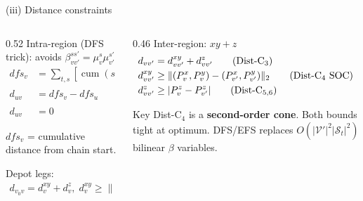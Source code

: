 \documentclass[aspectratio=169,10pt]{beamer}
\begin{document}
\begin{frame}{(iii) Distance constraints}
  \begin{columns}[T,onlytextwidth]
    \begin{column}{0.52\textwidth}
      {\small Intra-region (DFS trick): avoids $\beta_{vv'}^{ss'}=\mu_v^s\mu_{v'}^{s'}$}
      {\footnotesize
      \begin{align*}
        dfs_v &=\sum_{t,s}[\operatorname{cum}(s)\mu_v^{ts}+L(s)\eta_v^{ts}] \tag{DFS}\\
        d_{uv} &=dfs_v-dfs_u &&\!(u,v)\in\mathcal{E}_{RL}^{int} \tag{Dist-C$_1$}\\
        d_{uv} &=0 &&\!(u,v)\in\mathcal{E}_{LR}^{int} \tag{Dist-C$_2$}
      \end{align*}}
      {\scriptsize $dfs_v$ = cumulative distance from chain start. \par}
      \vspace{0.06cm}
      {\small Depot legs:}
      {\footnotesize
      \begin{align*}
        d_{v_0v}=d_v^{xy}+d_v^z,\; d_v^{xy}\ge\|(P_v^x,P_v^y)\|_2,\; d_v^z\ge|P_v^z| \tag{Dep-C}
      \end{align*}}
    \end{column}
    \begin{column}{0.46\textwidth}
      {\small Inter-region: $xy+z$}
      {\footnotesize
      \begin{align*}
        d_{vv'} &=d_{vv'}^{xy}+d_{vv'}^z \tag{Dist-C$_3$}\\
        d_{vv'}^{xy} &\ge\|(P_v^x,P_v^y)-(P_{v'}^x,P_{v'}^y)\|_2 \tag{Dist-C$_4$ SOC}\\
        d_{vv'}^z &\ge |P_v^z-P_{v'}^z| \tag{Dist-C$_{5,6}$}
      \end{align*}}
      \begin{block}{Key}
        {\scriptsize Dist-C$_4$ is a \textbf{second-order cone}. Both bounds tight at optimum. DFS/EFS replaces $O(|\mathcal{V}'|^2|\mathcal{S}_t|^2)$ bilinear $\beta$ variables.}
      \end{block}
    \end{column}
  \end{columns}
\end{frame}
\end{document}
